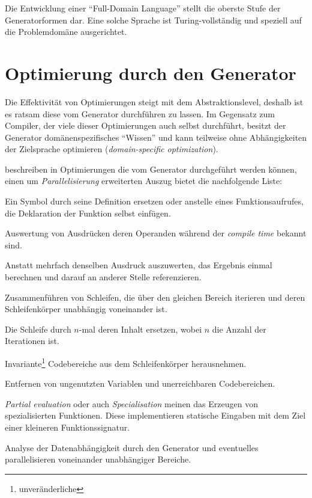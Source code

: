 Die Entwicklung einer \enquote{Full-Domain Language} stellt die oberste Stufe der Generatorformen dar. Eine solche Sprache ist Turing-vollständig und speziell auf die Problemdomäne ausgerichtet.

\section{Optimierung durch den Generator}

Die Effektivität von Optimierungen steigt mit dem Abstraktionslevel, deshalb ist es ratsam diese vom Generator durchführen zu lassen. Im Gegensatz zum Compiler, der viele dieser Optimierungen auch selbst durchführt, besitzt der Generator domänenspezifisches \enquote{Wissen} und kann teilweise ohne Abhängigkeiten der Zielsprache optimieren (\emph{domain-specific optimization}).

\citeauthor{czarnecki2000generative} beschreiben in \cite{czarnecki2000generative} Optimierungen die vom Generator durchgeführt werden können, einen um \emph{Parallelisierung} erweiterten Auszug bietet die nachfolgende Liste:

\begin{description}[style=nextline]
\item[Inlining]
    Ein Symbol durch seine Definition ersetzen oder anstelle eines Funktionsaufrufes, die Deklaration der Funktion selbst einfügen.
\item[Constant folding]
    Auswertung von Ausdrücken deren Operanden während der \emph{compile time} bekannt sind.
\item[Data caching]
    Anstatt mehrfach denselben Ausdruck auszuwerten, das Ergebnis einmal berechnen und darauf an anderer Stelle referenzieren.
\item[Loop fusion]
    Zusammenführen von Schleifen, die über den gleichen Bereich iterieren und deren Schleifenkörper unabhängig voneinander ist.
\item[Loop unrolling]
    Die Schleife durch $n$-mal deren Inhalt ersetzen, wobei $n$ die Anzahl der Iterationen ist.
\item[Code motion]
    Invariante\footnote{unveränderliche} Codebereiche aus dem Schleifenkörper herausnehmen.
\item[Dead-code elimination]
    Entfernen von ungenutzten Variablen und unerreichbaren Codebereichen.
\item[Partial evaluation/Specialisation]
    \emph{Partial evaluation} oder auch \emph{Specialisation} meinen das Erzeugen von spezialisierten Funktionen. Diese implementieren statische Eingaben mit dem Ziel einer kleineren Funktionssignatur.
\item[Parallelization]
    Analyse der Datenabhängigkeit durch den Generator und eventuelles parallelisieren voneinander unabhängiger Bereiche.
\end{description}
